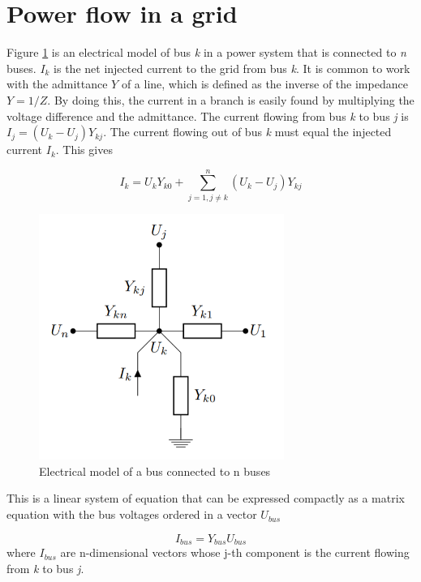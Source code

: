 \documentclass[class=book, crop=false]{standalone}
\begin{document}
\section{Power flow in a grid}
Figure \ref{fig:power_flow_network} is an electrical model of bus \textit{k} in a power system that is connected to \textit{n} buses. $I_{k}$ is the net injected current to the grid from bus \textit{k}\cite{opf_intro}. It is common to work with the admittance $Y$ of a line, which is defined as the inverse of the impedance $Y = 1/Z$. By doing this, the current in a branch is easily found by multiplying the voltage difference and the admittance. The current flowing from bus \textit{k} to bus \textit{j} is $I_{j} = (U_{k} - U_{j})Y_{kj}$. The current flowing out of bus \textit{k} must equal the injected current $I_{k}$. This gives

\begin{equation}\label{eq:powerflow_currentsum}
I_{k} =  U_{k}Y_{k0}
+ \sum_{j=1,j\neq k}^{n}(U_{k} - U_{j})Y_{kj}
\end{equation}


\begin{figure}[ht]
    \center
    \includegraphics[width=8cm]{figures/power_flow_network.PNG}
    \caption[size = 9]{Electrical model of a bus connected to n buses}
	\label{fig:power_flow_network}
\end{figure}

This is a linear system of equation that can be expressed compactly as a matrix equation with the bus voltages ordered in a vector $U_{bus}$

\begin{equation}\label{eq:powerflow_busmatrix}
I_{bus} = Y_{bus}U_{bus}
\end{equation}
where $I_{bus}$ are n-dimensional vectors whose j-th component is the current flowing from \textit{k} to bus \textit{j}.
\end{document}
